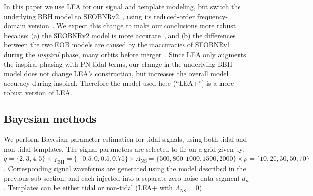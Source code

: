 \documentclass[aps,prd,amsmath,floats,floatfix, twocolumn,
superscriptaddress,nofootinbib,showpacs]{revtex4-1}
\newcommand{\lambdans}{\Lambda_\mathrm{NS}}
\newcommand{\chibh}{\chi_\mathrm{BH}}
\begin{document}
In this paper we use LEA for our signal and template modeling, but switch the 
underlying BBH model to SEOBNRv2~\cite{Taracchini:2013rva},
using its reduced-order frequency-domain version~\cite{Purrer:2015tud}. We
expect this change to make our conclusions more robust because: (a) the 
SEOBNRv2 model is more accurate~\cite{Kumar:2015tha,Kumar:2016dhh}, and (b)
the differences between the two EOB models are caused by the
inaccuracies of SEOBNRv1 during the {\it inspiral} phase, many orbits before 
merger~\cite{Kumar:2015tha}.
Since LEA only augments the inspiral phasing with PN tidal terms, our
change in the underlying BBH model does not change LEA's construction, but
increases the overall model accuracy during inspiral. Therefore the model used 
here (``LEA+'') is a more robust version of LEA.




\subsection{Bayesian methods}\label{s2:bayesian}

We perform Bayesian parameter estimation for tidal signals, using
both tidal and non-tidal templates. The signal parameters are selected 
to lie on a grid given by:
$q=\{2,3,4,5\}\times\chibh=\{-0.5,0,0.5,0.75\}\times\lambdans=\{500,800,1000,1500,2000\}\times\rho=\{10,20,30,50,70\}$.
Corresponding signal waveforms are generated using the model described in the 
previous sub-section, and each injected into a separate zero noise data segment
$d_n$. Templates can be either tidal or non-tidal (LEA+ with $\lambdans=0$).
\end{document}
